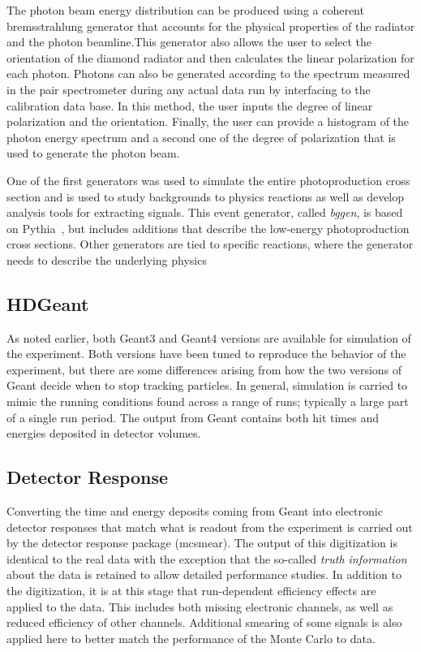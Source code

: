 The photon beam energy distribution can be produced using a coherent bremsstrahlung generator that accounts for the physical properties of the radiator and the photon beamline.This generator also allows the user to select the orientation of the diamond radiator and then calculates the linear polarization for each photon. Photons can also be generated according to the spectrum measured in the pair spectrometer during any actual data run by interfacing to the calibration data base. In this method, the user inputs the degree of linear polarization and the orientation. Finally, the user can provide a histogram of the photon energy spectrum and a second one of the degree of polarization that is used to generate the photon beam. 

One of the first generators was used to simulate the entire photoproduction cross section and is used to study backgrounds to physics reactions as well as develop analysis tools for extracting signals. This event generator, called {\em bggen}, is based on Pythia~\cite{Sjostrand:2006za}, but includes additions that describe the low-energy photoproduction cross sections. Other generators are tied to specific reactions, where the generator needs to describe the underlying physics

\subsection{HDGeant \label{sec:hdgeant}}
As noted earlier, both Geant3 and Geant4 versions are available for simulation of the experiment. Both versions have been tuned to reproduce the behavior of the experiment, but there are some differences arising from how the two versions of Geant decide when to stop tracking particles. In general, simulation is carried to mimic the running conditions found across a range of runs; typically a large part of a single run period. The output from Geant contains both hit times and energies deposited in detector volumes. 

\subsection[Detector response]{Detector Response}
Converting the time and energy deposits coming from Geant into electronic detector responses that match what is readout from the experiment is carried out by the detector response package (mcsmear). The output of this digitization is identical to the real data with the exception that the so-called \emph{truth information} about the data is retained to allow detailed performance studies. In addition to the digitization, it is at this stage that run-dependent efficiency effects are applied to the data. This includes both missing electronic channels, as well as reduced efficiency of other channels. Additional smearing of some signals is also applied here to better match the performance of the Monte Carlo to data. 

